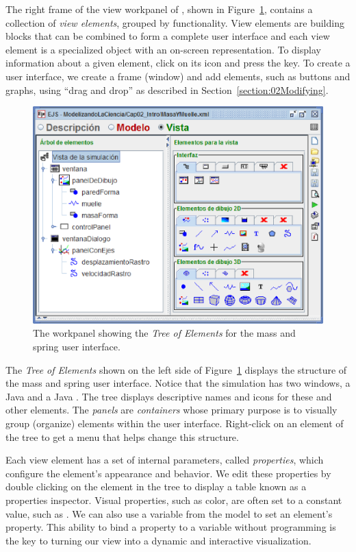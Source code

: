 The right frame of the view workpanel of \ejs, shown in Figure~\ref{fig:02EjsIntro/View}, contains a collection of \emph{view elements}, grouped by functionality. View elements are building blocks that can be combined to form a complete user interface and each view element is a specialized object with an on-screen representation. To display information about a given element, click on its icon
and press the  key. To create a user interface, we create a frame (window) and add elements, such as buttons and graphs, using ``drag and drop'' as described in Section~\ref{section:02Modifying}.
\begin{figure}[htb]
    \centering
  \includegraphics[scale=\scale]{02EjsIntro/images/View.eps}
    \caption{The  workpanel showing the \emph{Tree of Elements} for the mass and spring user interface. }
    \label{fig:02EjsIntro/View}
\end{figure}

The \emph{Tree of Elements} shown on the left side of Figure~\ref{fig:02EjsIntro/View} displays the structure of the mass and spring user interface. Notice that the simulation has two windows, a Java  and a Java .  The tree displays descriptive names and icons for these and other elements.  The \emph{panels} are \emph{containers} whose primary purpose is to visually group (organize) elements within the user interface. Right-click on an element of the tree to get a menu that helps change this structure.

Each view element has a set of internal parameters, called \emph{properties}, which configure the element's appearance and behavior. We edit these properties by double clicking on the element in the tree to display a table known as a properties inspector.  Visual properties, such as color, are often set to a constant value, such as . We can also use a variable from the model to set an element's property. This ability to bind a property to a variable without programming is the key to turning our view into a dynamic and interactive visualization.

